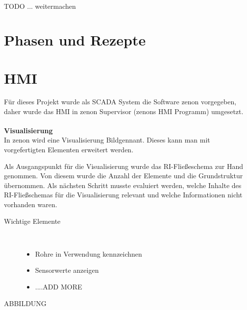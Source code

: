 		
		TODO ... weitermachen

\section{Phasen und Rezepte}
\section{HMI}
Für dieses Projekt wurde als SCADA System die Software zenon vorgegeben, daher wurde das HMI in zenon Supervisor (zenons HMI Programm) umgesetzt.\\
\\
\textbf{Visualisierung}\\
In zenon wird eine Visualisierung  \glqq Bild\grqq\space  gennant. Dieses kann man mit vorgefertigten Elementen erweitert werden. 

Als Ausgangspunkt für die Visualisierung wurde das RI-Fließeschema zur Hand genommen. Von diesem wurde die Anzahl der Elemente und die Grundstruktur übernommen. Als nächsten Schritt musste evaluiert werden, welche Inhalte des RI-Fließschemas für die Visualisierung relevant und welche Informationen nicht vorhanden waren.
\begin{description}
\item[Wichtige Elemente]~\par
	\begin{itemize}
		\item Rohre in Verwendung kennzeichnen
		\item Sensorwerte anzeigen
		\item ....ADD MORE
	\end{itemize}
\end{description}
ABBILDUNG\\

